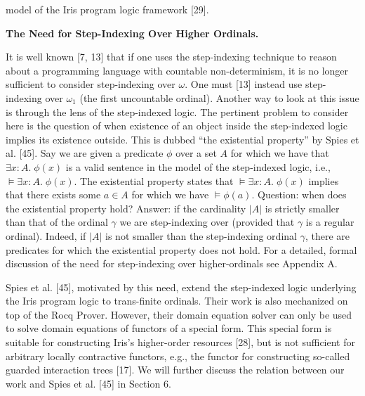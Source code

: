 \documentclass[10pt,a4paper]{article}
\begin{document}
model of the Iris program logic framework [29].\par
 
 
 
 
\par\medskip\noindent\textbf{The Need for Step-Indexing Over Higher Ordinals.}\par
 
 
It is well known [7, 13] that if one uses the step-indexing technique to reason about a programming language with countable non-determinism, it is no longer sufficient to consider step-indexing over $\omega$. One must [13] instead use step-indexing over $\omega_{1}$ (the first uncountable ordinal). Another way to look at this issue is through the lens of the step-indexed logic. The pertinent problem to consider here is the question of when existence of an object inside the step-indexed logic implies its existence outside. This is dubbed “the existential property” by Spies et al. [45]. Say we are given a predicate $\phi$ over a set $A$ for which we have that $\exists x:A.\;\phi(x)$ is a valid sentence in the model of the step-indexed logic, i.e., $\models\exists x:A.\;\phi(x)$. The existential property states that $\models\exists x:A.\;\phi(x)$ implies that there exists some $a\in A$ for which we have $\models\phi(a)$. Question: when does the existential property hold? Answer: if the cardinality $\left|A\right|$ is strictly smaller than that of the ordinal $\gamma$ we are step-indexing over (provided that $\gamma$ is a regular ordinal). Indeed, if $\left|A\right|$ is not smaller than the step-indexing ordinal $\gamma$, there are predicates for which the existential property does not hold. For a detailed, formal discussion of the need for step-indexing over higher-ordinals see Appendix A.\par
 
 
 
Spies et al. [45], motivated by this need, extend the step-indexed logic underlying the Iris program logic to trans-finite ordinals. Their work is also mechanized on top of the Rocq Prover. However, their domain equation solver can only be used to solve domain equations of functors of a special form. This special form is suitable for constructing Iris’s higher-order resources [28], but is not sufficient for arbitrary locally contractive functors, e.g., the functor for constructing so-called guarded interaction trees [17]. We will further discuss the relation between our work and Spies et al. [45] in Section 6.\par
 
\end{document}

